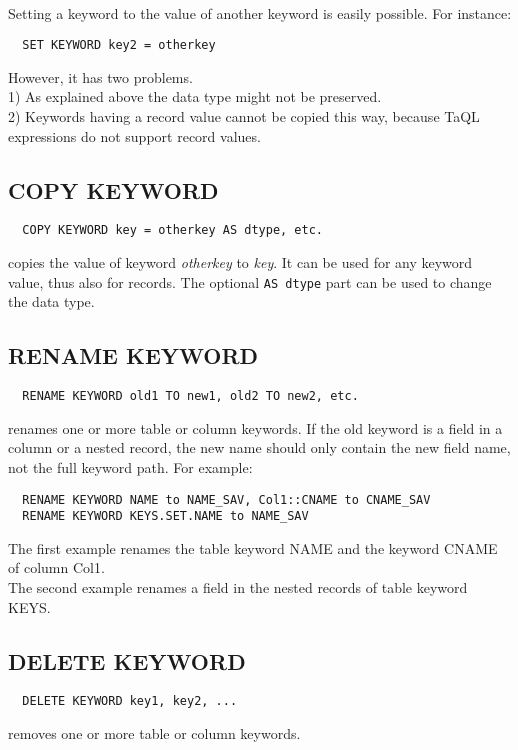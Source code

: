 \paragraph*{}
Setting a keyword to the value of another keyword is easily
possible. For instance:
\begin{verbatim}
  SET KEYWORD key2 = otherkey
\end{verbatim}
However, it has two problems.
\\1) As explained above the data type might not be preserved. 
\\2) Keywords having a record value cannot be copied this way,
because TaQL expressions do not support record values.

\subsection{COPY KEYWORD}
\begin{verbatim}
  COPY KEYWORD key = otherkey AS dtype, etc.
\end{verbatim}
copies the value of keyword {\em otherkey} to {\em key}. It can be
used for any keyword value, thus also for records.
The optional {\tt AS dtype}
part can be used to change the data type.

\subsection{RENAME KEYWORD}
\begin{verbatim}
  RENAME KEYWORD old1 TO new1, old2 TO new2, etc.
\end{verbatim}
renames one or more table or column keywords. If the old keyword is a
field in a column or a nested record, the new name should only contain the new
field name, not the full keyword path.
For example:
\begin{verbatim}
  RENAME KEYWORD NAME to NAME_SAV, Col1::CNAME to CNAME_SAV
  RENAME KEYWORD KEYS.SET.NAME to NAME_SAV
\end{verbatim}
The first example renames the table keyword NAME and the keyword CNAME
of column Col1.
\\The second example renames a field in the nested records of table
keyword KEYS.

\subsection{DELETE KEYWORD}
\begin{verbatim}
  DELETE KEYWORD key1, key2, ...
\end{verbatim}
removes one or more table or column keywords.

